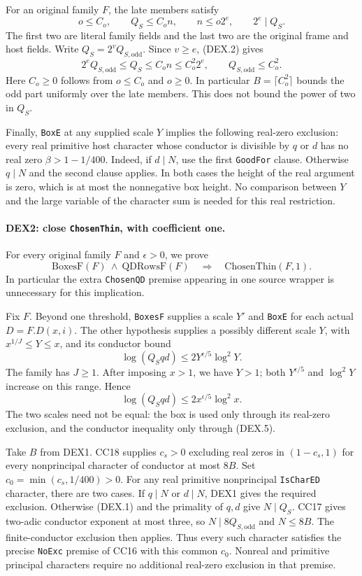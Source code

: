 For an original family $F$, the late members satisfy
\[
 o\le C_o,\qquad Q_S\le C_o n,\qquad
 n\le o2^e,\qquad 2^e\mid Q_S .                           \tag{DEX.2}
\]
The first two are literal family fields and the last two are the
original frame and host fields. Write $Q_S=2^vQ_{S,\mathrm{odd}}$.
Since $v\ge e$, (DEX.2) gives
\[
 2^eQ_{S,\mathrm{odd}}\le Q_S
       \le C_on\le C_o^2 2^e,
 \qquad Q_{S,\mathrm{odd}}\le C_o^2.                      \tag{DEX.3}
\]
Here $C_o\ge0$ follows from $o\le C_o$ and $o\ge0$.
In particular $B=\lceil C_o^2\rceil$ bounds the odd part uniformly
over the late members. This does not bound the power of two in $Q_S$.

Finally, \texttt{BoxE} at any supplied scale $Y$ implies the following
real-zero exclusion: every real primitive host character whose conductor
is divisible by $q$ or $d$ has no real zero $\beta>1-1/400$.
Indeed, if $d\mid N$, use the first \texttt{GoodFor} clause. Otherwise
$q\mid N$ and the second clause applies. In both cases the height of the
real argument is zero, which is at most the nonnegative box height.
No comparison between $Y$ and the large variable of the character sum is
needed for this real restriction.

\paragraph{DEX2: close \texttt{ChosenThin}, with coefficient one.}
\label{claim:DEX2}
For every original family $F$ and $\epsilon>0$, we prove
\[
 \mathrm{BoxesF}(F)\ \wedge\ \mathrm{QDRowsF}(F)
               \quad\Longrightarrow\quad
                         \mathrm{ChosenThin}(F,1).       \tag{DEX.4}
\]
In particular the extra \texttt{ChosenQD} premise appearing in one
source wrapper is unnecessary for this implication.

Fix $F$. Beyond one threshold, \texttt{BoxesF} supplies a scale $Y'$
and \texttt{BoxE} for each actual $D=F.D(x,i)$. The other hypothesis
supplies a possibly different scale $Y$, with
$x^{1/J}\le Y\le x$, and its conductor bound
\[
       \log(Q_Sqd)\le2Y^{\epsilon/5}\log^2Y.
\]
The family has $J\ge1$. After imposing $x>1$, we have $Y>1$;
both $Y^{\epsilon/5}$ and $\log^2Y$ increase on this range. Hence
\[
                     \log(Q_Sqd)
                         \le2x^{\epsilon/5}\log^2x.      \tag{DEX.5}
\]
The two scales need not be equal: the box is used only through its
real-zero exclusion, and the conductor inequality only through (DEX.5).

Take $B$ from DEX1. CC18 supplies $c_s>0$ excluding real zeros in
$(1-c_s,1)$ for every nonprincipal character of conductor at most $8B$.
Set $c_0=\min(c_s,1/400)>0$. For any real primitive nonprincipal
\texttt{IsCharED} character, there are two cases. If $q\mid N$ or
$d\mid N$, DEX1 gives the required exclusion. Otherwise (DEX.1) and
the primality of $q,d$ give $N\mid Q_S$. CC17 gives two-adic conductor
exponent at most three, so $N\mid8Q_{S,\mathrm{odd}}$ and $N\le8B$.
The finite-conductor exclusion then applies. Thus every such character
satisfies the precise \texttt{NoExc} premise of CC16 with this common
$c_0$. Nonreal and primitive principal characters require no additional
real-zero exclusion in that premise.

